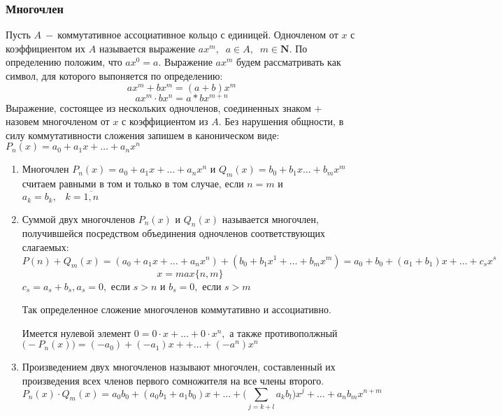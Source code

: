 \subsubsection{Многочлен}
Пусть $A~-~$коммутативное ассоциативное кольцо с единицей. Одночленом от $x$ с коэффициентом их $A$ называется выражение $ax^m,\;\;a\in A,\;\;m\in \mathbf{N}$. По определению положим, что $ax^0=a$. Выражение $ax^m$ будем рассматривать как символ, для которого выпоняется по определению: $$ax^m+bx^m=(a+b)x^m$$
$$ax^m\cdot bx^n= a * b x^{m+n}$$
Выражение, состоящее из нескольких одночленов, соединенных знаком $+$ назовем многочленом от $x$ с коэффициентом из $A$. Без нарушения общности, в силу коммутативности сложения запишем в каноническом виде: $P_n(x)=a_0+a_1x+\dots+a_nx^n$
\begin{enumerate}
    \item\label{1} Многочлен $P_n(x)=a_0+a_1x+\dots+a_nx^n$ и $Q_m(x)=b_0+b_1x\dots+b_mx^m $ считаем равными в том и только в том случае, если $n=m$ и $a_k=b_k,\;\;\;k=\overline{1,n}$
    \item Суммой двух многочленов $P_n(x)$ и $Q_n(x)$ называется многочлен, получившейся посредством объединения одночленов соответствующих слагаемых:$$P(n)+Q_m(x)=(a_0+a_1x+\dots+a_nx^n)+(b_0+b_1x^1+\dots+b_mx^m)=a_0+b_0+ (a_1+b_1)x+\dots+c_sx^s$$ 
    $$x=max\{n,m\} $$
    $c_s=a_s+b_s,a_s=0,$ если $s>n$ и $b_s=0,$ если $s>m$\par Так определенное сложение многочленов коммутативно и ассоциативно.\par Имеется нулевой элемент $0=0 \cdot x + \dots + 0 \cdot x^n,$ а также противополжный $\big(-P_n(x)\big)=(-a_0)+(-a_1)x++\dots+(-a^n)x^n$
    \item Произведением двух многочленов называют многочлен, составленный их произведения всех членов первого сомножителя на все члены второго.
    $$P_n(x)\cdot Q_m(x)=a_0b_0+(a_0b_1+a_1b_0)x+\dots+\Big(\displaystyle\sum_{j=k+l}a_kb_l \Big)x^j+\dots+a_nb_mx^{n+m}$$
    
\end{enumerate}
